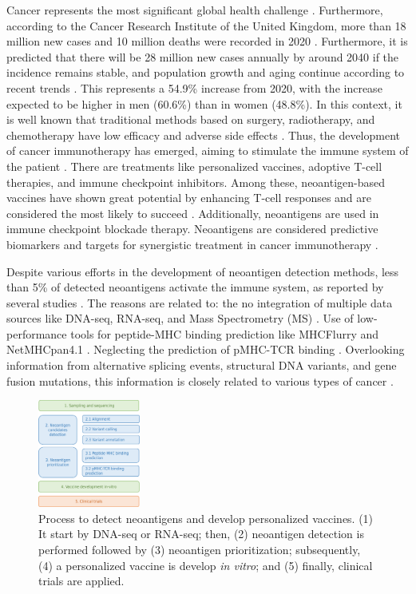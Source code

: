 Cancer represents the most significant global health challenge \cite{siegel2023cancer}. Furthermore, according to the Cancer Research Institute of the United Kingdom, more than 18 million new cases and 10 million deaths were recorded in 2020 \cite{cancerUK2023}. Furthermore, it is predicted that there will be 28 million new cases annually by around 2040 if the incidence remains stable, and population growth and aging continue according to recent trends \cite{cancerUK2023_2}. This represents a 54.9\% increase from 2020, with the increase expected to be higher in men (60.6\%) than in women (48.8\%). In this context, it is well known that traditional methods based on surgery, radiotherapy, and chemotherapy have low efficacy and adverse side effects \cite{peng2019neoantigen}. Thus, the development of cancer immunotherapy has emerged, aiming to stimulate the immune system of the patient \cite{borden2022cancer}. There are treatments like personalized vaccines, adoptive T-cell therapies, and immune checkpoint inhibitors. Among these, neoantigen-based vaccines have shown great potential by enhancing T-cell responses and are considered the most likely to succeed \cite{borden2022cancer}. Additionally, neoantigens are used in immune checkpoint blockade therapy. Neoantigens are considered predictive biomarkers and targets for synergistic treatment in cancer immunotherapy \cite{fang2022neoantigens}.


Despite various efforts in the development of neoantigen detection methods, less than 5\% of detected neoantigens activate the immune system, as reported by several studies \cite{de2020neoantigen, mill2022neoms, bulik2019deep, bassani2015mass, yadav2014predicting}. The reasons are related to: the no integration of multiple data sources like DNA-seq, RNA-seq, and Mass Spectrometry (MS) \cite{kim2018neopepsee}. Use of low-performance tools for peptide-MHC binding prediction like MHCFlurry \cite{o2020mhcflurry} and NetMHCpan4.1 \cite{reynisson2020netmhcpan}. Neglecting the prediction of pMHC-TCR binding \cite{rubinsteyn2018computational}. Overlooking information from alternative splicing events, structural DNA variants, and gene fusion mutations, this information is closely related to various types of cancer \cite{wood2020neoepiscope}.

\begin{figure}[h]
	\centering	
	\includegraphics[width=0.3\textwidth]{../img/pipeline/pipeline_ingles}	
	\caption{Process to detect neoantigens and develop personalized vaccines. (1) It start by DNA-seq or RNA-seq; then, (2) neoantigen detection is performed followed by (3) neoantigen prioritization; subsequently, (4) a personalized vaccine is develop \textit{in vitro}; and (5) finally, clinical trials are applied.}
	\label{fig:pipeline}
\end{figure}

